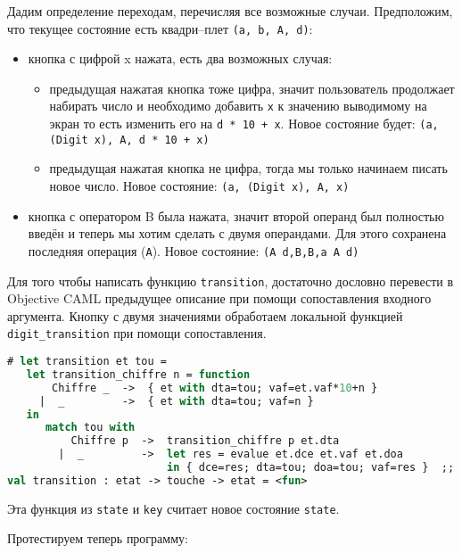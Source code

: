 Дадим определение переходам, перечисляя все возможные случаи. Предположим, что
текущее состояние есть квадри--плет \texttt{(a, b, A, d)}:

\begin{itemize}
	\item кнопка с цифрой x нажата, есть два возможных случая:

	\begin{itemize}
		\item предыдущая нажатая кнопка тоже цифра, значит пользователь
продолжает	набирать число и необходимо добавить \texttt{x} к значению
выводимому на экран	то есть изменить его на \texttt{d * 10 + x}. Новое состояние
будет:	\texttt{(a,(Digit x), A, d * 10 + x)}

		\item предыдущая нажатая кнопка не цифра, тогда мы только начинаем
писать	новое число. Новое состояние: \texttt{(a, (Digit x), A, x)}
	\end{itemize}

	\item кнопка с оператором B была нажата, значит второй операнд был полностью
введён и теперь мы хотим  сделать с двумя операндами. Для этого
сохранена последняя операция (\texttt{А}). Новое состояние: \texttt{(A d,B,B,a A
d)}
\end{itemize}

Для того чтобы написать функцию \texttt{transition}, достаточно дословно
перевести в Objective CAML предыдущее описание при помощи сопоставления входного
аргумента. Кнопку с двумя значениями обработаем локальной функцией
\texttt{digit\_transition} при помощи сопоставления.

\begin{lstlisting}[language=OCaml]
# let transition et tou =
   let transition_chiffre n = function
       Chiffre _  ->  { et with dta=tou; vaf=et.vaf*10+n }
     |  _         ->  { et with dta=tou; vaf=n }
   in
      match tou with
          Chiffre p  ->  transition_chiffre p et.dta
        |  _         ->  let res = evalue et.dce et.vaf et.doa
                         in { dce=res; dta=tou; doa=tou; vaf=res }  ;;
val transition : etat -> touche -> etat = <fun>
\end{lstlisting}

Эта функция из \texttt{state} и \texttt{key} считает новое состояние
\texttt{state}.

Протестируем теперь программу:

